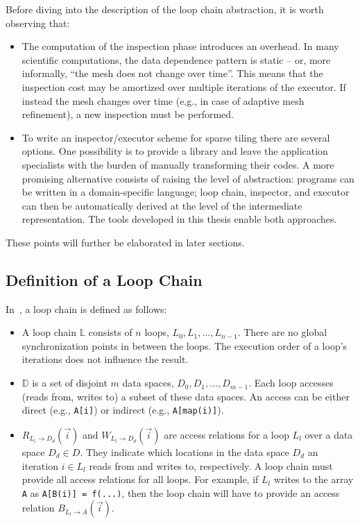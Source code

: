 Before diving into the description of the loop chain abstraction, it is worth observing that:
\begin{itemize}
\item The computation of the inspection phase introduces an overhead. In many scientific computations, the data dependence pattern is static -- or, more informally, ``the mesh does not change over time''. This means that the inspection cost may be amortized over multiple iterations of the executor. If instead the mesh changes over time (e.g., in case of adaptive mesh refinement), a new inspection must be performed. 
\item To write an inspector/executor scheme for sparse tiling there are several options. One possibility is to provide a library and leave the application specialists with the burden of manually transforming their codes. A more promising alternative consists of raising the level of abstraction: programs can be written in a domain-specific language; loop chain, inspector, and executor can then be automatically derived at the level of the intermediate representation. The tools developed in this thesis enable both approaches.
\end{itemize}
These points will further be elaborated in later sections.

\subsection{Definition of a Loop Chain}
In~\cite{ST-KriegerHIPS2013}, a loop chain is defined as follows:
\begin{itemize}
\item A loop chain $\mathbb{L}$ consists of $n$ loops, $L_0, L_1, ..., L_{n-1}$. There are no global synchronization points in between the loops. The execution order of a loop's iterations does not influence the result.
\item $\mathbb{D}$ is a set of disjoint $m$ data spaces, $D_0, D_1, ..., D_{m-1}$. Each loop accesses (reads from, writes to) a subset of these data spaces. An access can be either direct (e.g., \texttt{A[i]}) or indirect (e.g., \texttt{A[map(i)]}).
\item $R_{L_l\rightarrow D_d}(\vec{i})$ and $W_{L_l\rightarrow D_d}(\vec{i})$ are access relations for a loop $L_l$ over a data space $D_d \in D$. They indicate which locations in the data space $D_d$ an iteration $i \in L_l$ reads from and writes to, respectively. A loop chain must provide all access relations for all loops. For example, if $L_l$ writes to the array {\tt A} as {\tt A[B(i)] = f(...)}, then the loop chain will have to provide an access relation $B_{L_l\rightarrow A}(\vec{i})$. 
\end{itemize}

